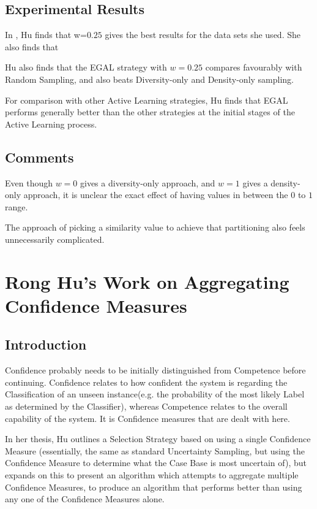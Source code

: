 \documentclass[a4paper,11pt]{report}
\begin{document}
\subsection{Experimental Results}
In \citet{Hu2011}, Hu finds that w=$0.25$ gives the best results for the data sets she used. She also finds that 

Hu also finds that the EGAL strategy with $w=0.25$ compares favourably with Random Sampling, and also beats Diversity-only and Density-only sampling.

For comparison with other Active Learning strategies, Hu finds that EGAL performs generally better than the other strategies at the initial stages of the Active Learning process.

\subsection{Comments}
Even though $w=0$ gives a diversity-only approach, and $w=1$ gives a density-only approach, it is unclear the exact effect of having values in between the $0$ to $1$ range.

The approach of picking a similarity value to achieve that partitioning also feels unnecessarily complicated.

\section{Rong Hu's Work on Aggregating Confidence Measures}
\subsection{Introduction}
Confidence probably needs to be initially distinguished from Competence before continuing. Confidence relates to how confident the system is regarding the Classification of an unseen instance(e.g. the probability of the most likely Label as determined by the Classifier), whereas Competence relates to the overall capability of the system. It is Confidence measures that are dealt with here.

In her thesis\citep{Hu2011}, Hu outlines a Selection Strategy based on using a single Confidence Measure (essentially, the same as standard Uncertainty Sampling, but using the Confidence Measure to determine what the Case Base is most uncertain of), but expands on this to present an algorithm which attempts to aggregate multiple Confidence Measures, to produce an algorithm that performs better than using any one of the Confidence Measures alone.
\end{document}
